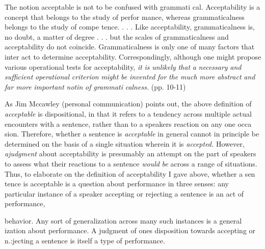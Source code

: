 \begin{styleStandard}
The notion {\textquotedbl}acceptable{\textquotedbl} is not to be confused with {\textquotedbl}grammati\- cal.{\textquotedbl} Acceptability is a concept that belongs to the study of perfor\- mance, whereas grammaticalness belongs to the study of compe\- tence. . . . Like acceptability, grammaticalness is, no doubt, a matter of degree . . . but the scales of grammaticalness and acceptability do not coincide. Grammaticalness is only one of many factors that inter\- act to determine acceptability. Correspondingly, although one might propose various operational tests for acceptability, \textit{it}\textit{ }\textit{is}\textit{ }\textit{unlikely}\textit{ }\textit{that}\textit{ }\textit{a}\textit{ }\textit{necessary}\textit{ }\textit{and}\textit{ }\textit{sufficient}\textit{ }\textit{operational}\textit{ }\textit{criterion}\textit{ }\textit{might}\textit{ }\textit{be}\textit{ }\textit{invented}\textit{ }\textit{for}\textit{ }\textit{the}\textit{ }\textit{much}\textit{ }\textit{more}\textit{ }\textit{abstract}\textit{ }\textit{and}\textit{ }\textit{far more}\textit{ }\textit{important}\textit{ }\textit{noti}\textit{n}\textit{ }\textit{of}\textit{ }\textit{grammati\-}\textit{ }\textit{calness.}\textit{ }(pp. 10-11)
\end{styleStandard}


\begin{styleStandard}
As Jim Mccawley (personal communication) points out, the above definition of \textit{acceptable}\textit{ }is dispositional, in that it refers to a tendency across multiple actual encounters with a sentence, rather than to a speaker{\textquotesingle}s reaction on any one occa\- sion. Therefore, whether a sentence is \textit{acceptable}\textit{ }in general cannot in principle be determined on the basis of a single situation wherein it is \textit{accepted.}\textit{ }However, \textit{ajudgment}\textit{ }about acceptability is presumably an attempt on the part of speakers to assess what their reactions to a sentence \textit{would}\textit{ }\textit{be}\textit{ }across a range of situations. Thus, to elaborate on the definition of acceptability I gave above, whether a sen\- tence is acceptable is a question about performance in three senses: any particular instance of a speaker accepting or rejecting a sentence is an act of performance,
\end{styleStandard}


\clearpage\setcounter{page}{1}\begin{styleStandard}
behavior. Any sort of generalization across many such instances is a general\- ization about performance. A judgment of one{\textquotesingle}s disposition towards accepting or n.:jecting a sentence is itself a type of performance.
\end{styleStandard}


